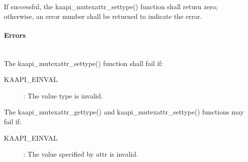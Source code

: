 \begin{description}
If successful, the kaapi\_mutexattr\_settype() function shall return zero;
otherwise, an error number shall be returned to indicate the error.

\paragraph{Errors}~\\
The kaapi\_mutexattr\_settype() function shall fail if:

\begin{description}
\item [KAAPI\_EINVAL]: The value type is invalid.
\end{description}

The kaapi\_mutexattr\_gettype() and kaapi\_mutexattr\_settype() functions may
fail if:

\begin{description}
\item [KAAPI\_EINVAL]: The value specified by attr is invalid.
\end{description}
\end{description}



